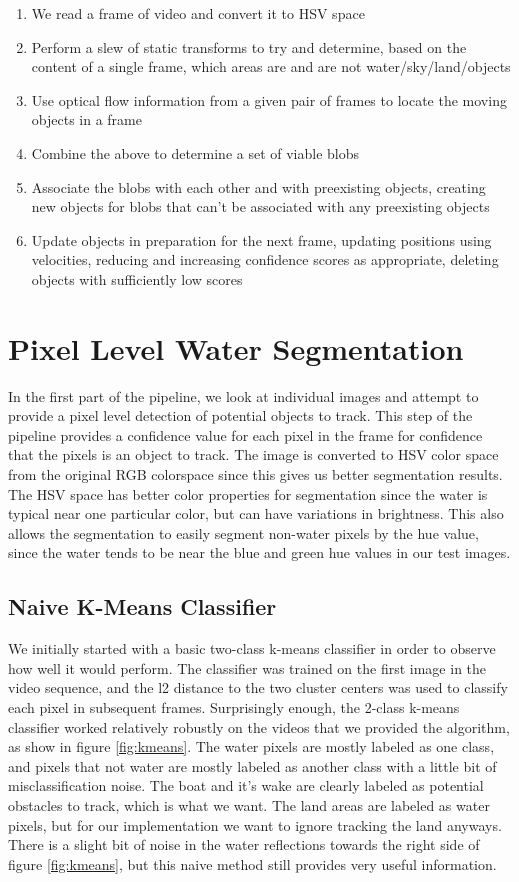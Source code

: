 \documentclass{article}
\begin{document}
\begin{enumerate}
\item We read a frame of video and convert it to HSV space
\item Perform a slew of static transforms to try and determine,
      based on the content of a single frame, which areas are and
      are not water/sky/land/objects
\item Use optical flow information from a given pair of frames to
      locate the moving objects in a frame
\item Combine the above to determine a set of viable blobs
\item Associate the blobs with each other and with preexisting objects,
      creating new objects for blobs that can't be associated with any
      preexisting objects
\item Update objects in preparation for the next frame, updating
      positions using velocities, reducing and increasing confidence
      scores as appropriate, deleting objects with sufficiently low
      scores
\end{enumerate}

\section{Pixel Level Water Segmentation}
In the first part of the pipeline, we look at individual images and attempt to
provide a pixel level detection of potential objects to track.  This step of the
pipeline provides a confidence value for each pixel in the frame for confidence
that the pixels is an object to track.
The image is converted to HSV color space from the original RGB colorspace since
this gives us better segmentation results. The HSV space has better color
properties for segmentation since the water is typical near one particular
color, but can have variations in brightness.  This also allows the segmentation
to easily segment non-water pixels by the hue value, since the water tends to be
near the blue and green hue values in our test images.

\subsection{Naive K-Means Classifier}
We initially started with a basic two-class k-means classifier in order to
observe how well it would perform.  The classifier was trained on the first
image in the video sequence, and the l2 distance to the two cluster centers was
used to classify each pixel in subsequent frames.  Surprisingly enough, the
2-class k-means classifier worked relatively robustly on the videos that we
provided the algorithm, as show in figure \ref{fig:kmeans}.  The water pixels
are mostly labeled as one class, and pixels that not water are mostly labeled as
another class with a little bit of misclassification noise.  The boat and it's
wake are clearly labeled as potential obstacles to track, which is what we want.
The land areas are labeled as water pixels, but for our implementation we want
to ignore tracking the land anyways. There is a slight bit of noise in the water
reflections towards the right side of figure \ref{fig:kmeans}, but this naive
method still provides very useful information.
\end{document}
